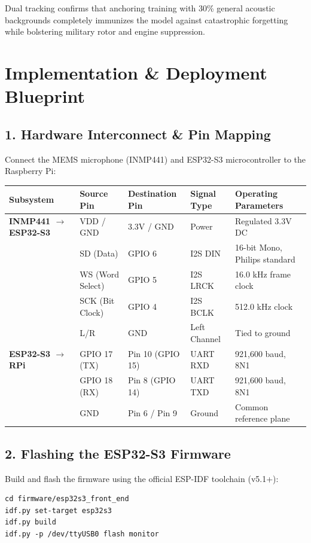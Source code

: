 \documentclass[11pt,a4paper]{article}
\begin{document}
\noindent Dual tracking confirms that anchoring training with 30\% general acoustic backgrounds completely immunizes the model against catastrophic forgetting while bolstering military rotor and engine suppression.

\section{Implementation \& Deployment Blueprint}

\subsection{1. Hardware Interconnect \& Pin Mapping}
Connect the MEMS microphone (INMP441) and ESP32-S3 microcontroller to the Raspberry Pi:

\begin{center}
\small
\begin{tabularx}{\textwidth}{l l l l X}
\toprule
\textbf{Subsystem} & \textbf{Source Pin} & \textbf{Destination Pin} & \textbf{Signal Type} & \textbf{Operating Parameters} \\
\midrule
\textbf{INMP441 $\rightarrow$ ESP32-S3} & VDD / GND & 3.3V / GND & Power & Regulated 3.3V DC \\
& SD (Data) & GPIO 6 & I2S DIN & 16-bit Mono, Philips standard \\
& WS (Word Select) & GPIO 5 & I2S LRCK & 16.0 kHz frame clock \\
& SCK (Bit Clock) & GPIO 4 & I2S BCLK & 512.0 kHz clock \\
& L/R & GND & Left Channel & Tied to ground \\
\midrule
\textbf{ESP32-S3 $\rightarrow$ RPi} & GPIO 17 (TX) & Pin 10 (GPIO 15) & UART RXD & 921,600 baud, 8N1 \\
& GPIO 18 (RX) & Pin 8 (GPIO 14) & UART TXD & 921,600 baud, 8N1 \\
& GND & Pin 6 / Pin 9 & Ground & Common reference plane \\
\bottomrule
\end{tabularx}
\end{center}

\subsection{2. Flashing the ESP32-S3 Firmware}
Build and flash the firmware using the official ESP-IDF toolchain (v5.1+):
\begin{verbatim}
cd firmware/esp32s3_front_end
idf.py set-target esp32s3
idf.py build
idf.py -p /dev/ttyUSB0 flash monitor
\end{verbatim}
\end{document}
